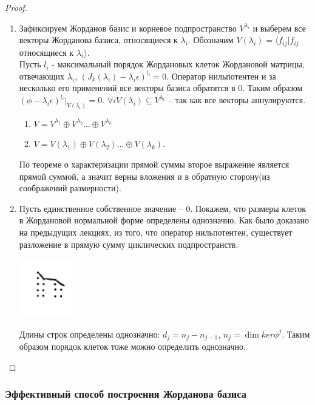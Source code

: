 \begin{proof}~
    \begin{enumerate}
        \item  Зафиксируем Жорданов базис и корневое подпространство $V^{\lambda_i}$ и выберем все векторы Жорданова базиса, относящиеся к $\lambda_i$. Обозначим $V(\lambda_i) = \langle f_{ij} | f_{ij}$ относящиеся к $\lambda_i \rangle$. \\
        Пусть $l_i$ - максимальный порядок Жордановых клеток Жордановой матрицы, отвечающих $\lambda_i$, $(J_k(\lambda_i) - \lambda_i \epsilon)^{l_i} = 0$. 
        Оператор нильпотентен и за несколько его применений все векторы базиса обратятся в 0.
        Таким образом $(\phi - \lambda_i \epsilon)^{l_i} \vert_{V(\lambda_i)} = 0$.
        $\forall i V(\lambda_i) \subseteq V^{\lambda_i}$ -- так как все векторы аннулируются.
        \begin{enumerate}
            \item $V = V^{\lambda_1} \oplus V^{\lambda_2} \dots \oplus V^{\lambda_k}$
            \item $V = V(\lambda_1) \oplus V(\lambda_2) \dots \oplus V(\lambda_k)$.
        \end{enumerate}
        По теореме о характеризации прямой суммы второе выражение является прямой суммой, а значит верны вложения и в обратную сторону(из соображений размерности).
        \item Пусть единственное собственное значение -- 0. Покажем, что размеры клеток в Жордановой нормальной форме определены однозначно. 
        Как было доказано на предыдущих лекциях, из того, что оператор нильпотентен, существует разложение в прямую сумму циклических подпространств.
        \begin{center}
            \includegraphics[width = 0.2\textwidth]{images/lec6_5.PNG}
        \end{center}
        Длины строк определены однозначно: $d_j = n_j - n_{j-1}$, $n_j = \dim ker \phi^j$. Таким образом порядок клеток тоже можно определить однозначно.
    \end{enumerate}
\end{proof}

\subsubsection{Эффективный способ построения Жорданова базиса}


